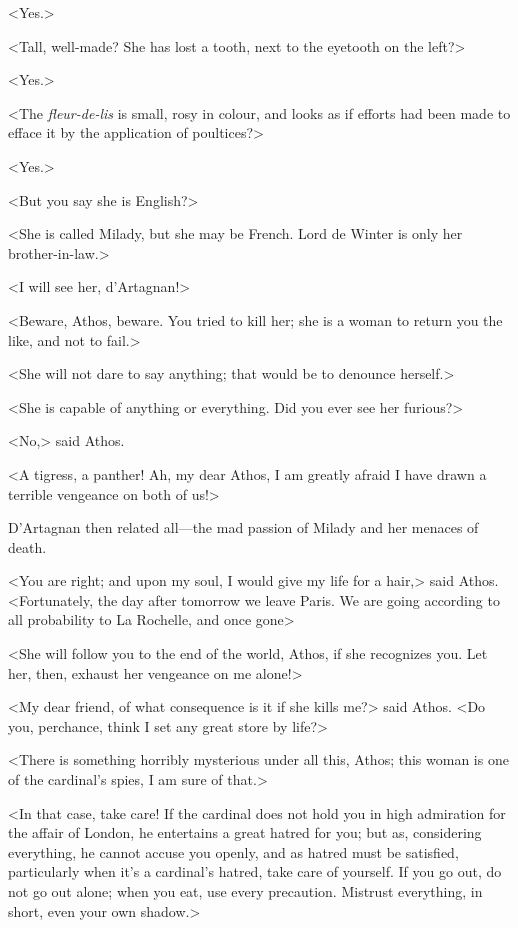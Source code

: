 <Yes.> 

<Tall, well-made? She has lost a tooth, next to the eyetooth on the left?> 

<Yes.> 

<The \textit{fleur-de-lis} is small, rosy in colour, and looks as if efforts had been made to efface it by the application of poultices?> 

<Yes.> 

<But you say she is English?> 

<She is called Milady, but she may be French. Lord de Winter is only her brother-in-law.> 

<I will see her, d'Artagnan!> 

<Beware, Athos, beware. You tried to kill her; she is a woman to return you the like, and not to fail.> 

<She will not dare to say anything; that would be to denounce herself.> 

<She is capable of anything or everything. Did you ever see her furious?> 

<No,> said Athos. 

<A tigress, a panther! Ah, my dear Athos, I am greatly afraid I have drawn a terrible vengeance on both of us!> 

D'Artagnan then related all---the mad passion of Milady and her menaces of death. 

<You are right; and upon my soul, I would give my life for a hair,> said Athos. <Fortunately, the day after tomorrow we leave Paris. We are going according to all probability to La Rochelle, and once gone\longdash> 

<She will follow you to the end of the world, Athos, if she recognizes you. Let her, then, exhaust her vengeance on me alone!> 

<My dear friend, of what consequence is it if she kills me?> said Athos. <Do you, perchance, think I set any great store by life?> 

<There is something horribly mysterious under all this, Athos; this woman is one of the cardinal's spies, I am sure of that.> 

<In that case, take care! If the cardinal does not hold you in high admiration for the affair of London, he entertains a great hatred for you; but as, considering everything, he cannot accuse you openly, and as hatred must be satisfied, particularly when it's a cardinal's hatred, take care of yourself. If you go out, do not go out alone; when you eat, use every precaution. Mistrust everything, in short, even your own shadow.> 

